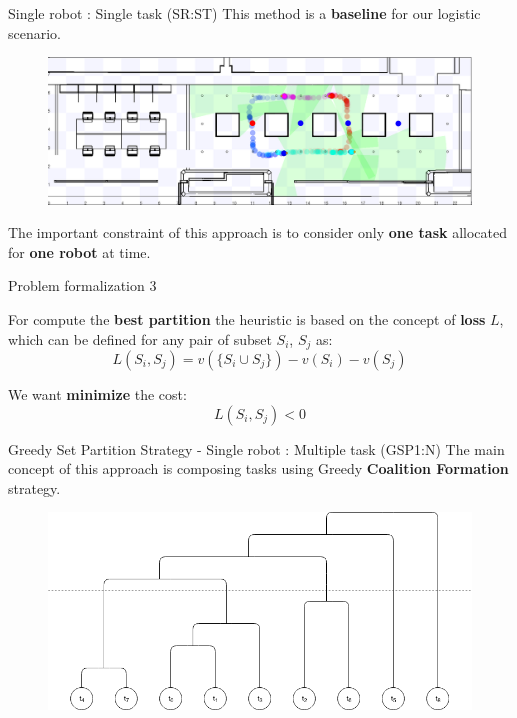     \begin{frame}[fragile]{Single robot : Single task (SR:ST)}
        This method is a {\bf baseline} for our logistic scenario.

        \begin{figure}[hbt]
            \centering
            \includegraphics[width=\textwidth]{img/cycle1.png}
        \end{figure}
        The important constraint of this approach is to consider only {\bf one task} allocated for 
{\bf one robot} at time.
    \end{frame}


    \begin{frame}[fragile]{Problem formalization 3}

        For compute the {\bf best partition} the heuristic is based on the concept of {\bf loss} $L$,
        which can be defined for any pair of subset $S_i$, $S_j$ as:
        \[L(S_i,S_j) = v(\{ S_i \cup S_j\}) - v(S_i) - v(S_j)\]

        We want {\bf minimize} the cost:
        \[L(S_i,S_j) < 0 \]
    \end{frame}

    \begin{frame}[fragile]{Greedy Set Partition Strategy - Single robot : Multiple task (GSP1:N)}
        The main concept of this approach is composing tasks using Greedy {\bf Coalition Formation} strategy.
        \begin{figure}[hbt]
            \centering
            \includegraphics[width=\textwidth]{img/SP.png}
        \end{figure}
    \end{frame}


